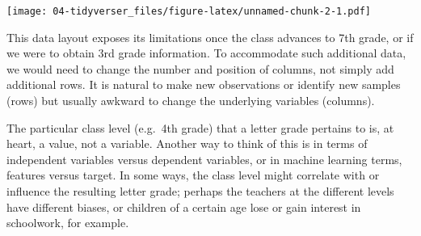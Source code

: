 \documentclass[
]{book}
\newenvironment{Shaded}{\begin{snugshade}}{\end{snugshade}}
\newcommand{\AttributeTok}[1]{\textcolor[rgb]{0.77,0.63,0.00}{#1}}
\newcommand{\CommentTok}[1]{\textcolor[rgb]{0.56,0.35,0.01}{\textit{#1}}}
\newcommand{\DecValTok}[1]{\textcolor[rgb]{0.00,0.00,0.81}{#1}}
\newcommand{\FloatTok}[1]{\textcolor[rgb]{0.00,0.00,0.81}{#1}}
\newcommand{\FunctionTok}[1]{\textcolor[rgb]{0.00,0.00,0.00}{#1}}
\newcommand{\NormalTok}[1]{#1}
\newcommand{\SpecialCharTok}[1]{\textcolor[rgb]{0.00,0.00,0.00}{#1}}
\newcommand{\StringTok}[1]{\textcolor[rgb]{0.31,0.60,0.02}{#1}}
\begin{document}
\begin{Shaded}
\end{Shaded}

\texttt{[image: 04-tidyverser\_files/figure-latex/unnamed-chunk-2-1.pdf]}

This data layout exposes its limitations once the class advances to 7th grade, or if we were to obtain 3rd grade information. To accommodate such additional data, we would need to change the number and position of columns, not simply add additional rows. It is natural to make new observations or identify new samples (rows) but usually awkward to change the underlying variables (columns).

The particular class level (e.g.~4th grade) that a letter grade pertains to is, at heart, a value, not a variable. Another way to think of this is in terms of independent variables versus dependent variables, or in machine learning terms, features versus target. In some ways, the class level might correlate with or influence the resulting letter grade; perhaps the teachers at the different levels have different biases, or children of a certain age lose or gain interest in schoolwork, for example.
\end{document}
